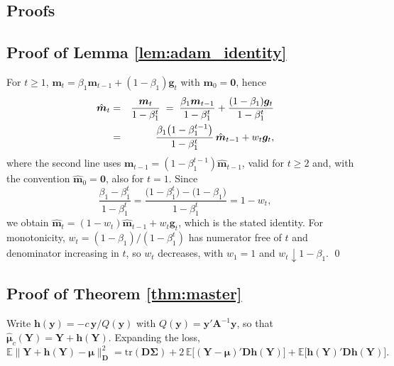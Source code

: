 \documentclass[pdflatex,sn-mathphys-num]{sn-jnl}%
\theoremstyle{thmstyleone}%
\theoremstyle{thmstyletwo}%
\theoremstyle{thmstylethree}%
\newcommand{\tr}{\mathrm{tr}}
\newcommand{\E}{\mathbb{E}}
\begin{document}
\begin{appendices}

\section{Proofs}
\label{sec:proofs}

\subsection*{Proof of Lemma \ref{lem:adam_identity}}

For $t\ge1$, $\bm m_t=\beta_1\bm m_{t-1}+(1-\beta_1)\bm g_t$ with $\bm m_0=\bm 0$, hence
\begin{eqnarray}
\hat{\bm m}_t
&=&
\frac{\bm m_t}{1-\beta_1^{t}}
\;=\;
\frac{\beta_1\bm m_{t-1}}{1-\beta_1^{t}}
+\frac{(1-\beta_1)\bm g_t}{1-\beta_1^{t}}
\cr
&=&
\frac{\beta_1\bigl(1-\beta_1^{t-1}\bigr)}{1-\beta_1^{t}}\,\hat{\bm m}_{t-1}
+w_t\bm g_t ,
\end{eqnarray}
where the second line uses $\bm m_{t-1}=(1-\beta_1^{t-1})\hat{\bm m}_{t-1}$, valid for $t\ge2$ and, with the convention $\hat{\bm m}_0=\bm 0$, also for $t=1$. Since
\begin{equation}
\frac{\beta_1-\beta_1^{t}}{1-\beta_1^{t}}
=
\frac{\bigl(1-\beta_1^{t}\bigr)-\bigl(1-\beta_1\bigr)}{1-\beta_1^{t}}
=
1-w_t ,
\end{equation}
we obtain $\hat{\bm m}_t=(1-w_t)\hat{\bm m}_{t-1}+w_t\bm g_t$, which is the stated identity. For monotonicity, $w_t=(1-\beta_1)/(1-\beta_1^t)$ has numerator free of $t$ and denominator increasing in $t$, so $w_t$ decreases, with $w_1=1$ and $w_t\downarrow1-\beta_1$. \qed

\subsection*{Proof of Theorem \ref{thm:master}}

Write $\bm h(\bm y)=-c\,\bm y/Q(\bm y)$ with $Q(\bm y)=\bm y'\bm A^{-1}\bm y$, so that $\hat{\bm\mu}_c(\bm Y)=\bm Y+\bm h(\bm Y)$. Expanding the loss,
\begin{equation}
\label{eq:pf_expand}
\E\bigl\|\bm Y+\bm h(\bm Y)-\bm\mu\bigr\|^2_{\bm D}
=
\tr(\bm D\bm\Sigma)
+2\,\E\bigl[(\bm Y-\bm\mu)'\bm D\bm h(\bm Y)\bigr]
+\E\bigl[\bm h(\bm Y)'\bm D\bm h(\bm Y)\bigr].
\end{equation}


\end{appendices}
\end{document}
